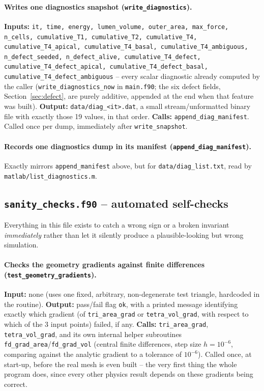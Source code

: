 \documentclass[11pt,a4paper]{report}
\begin{document}
\paragraph{Writes one diagnostics snapshot
(\texttt{write\_diagnostics}).} \textbf{Inputs:} \texttt{it, time,
energy, lumen\_volume, outer\_area, max\_force, n\_cells,
cumulative\_T1, cumulative\_T2, cumulative\_T4,
cumulative\_T4\_apical, cumulative\_T4\_basal,
cumulative\_T4\_ambiguous, n\_defect\_seeded, n\_defect\_alive,
cumulative\_T4\_defect, cumulative\_T4\_defect\_apical,
cumulative\_T4\_defect\_basal, cumulative\_T4\_defect\_ambiguous} --
every scalar diagnostic already computed by the caller
(\texttt{write\_diagnostics\_now} in \texttt{main.f90}; the six defect
fields, Section~\ref{sec:defect}, are purely additive, appended at the
end when that feature was built). \textbf{Output:}
\texttt{data/diag\_<it>.dat}, a small stream/unformatted binary file
with exactly those 19 values, in that order. \textbf{Calls:}
\texttt{append\_diag\_manifest}. Called once per dump, immediately
after \texttt{write\_snapshot}.
\paragraph{Records one diagnostics dump in its manifest
(\texttt{append\_diag\_manifest}).} Exactly mirrors
\texttt{append\_manifest} above, but for
\texttt{data/diag\_list.txt}, read by \texttt{matlab/list\_diagnostics.m}.

\subsection{\texttt{sanity\_checks.f90} -- automated self-checks}
\label{sec:mod-sanity}
Everything in this file exists to catch a wrong sign or a broken
invariant \emph{immediately} rather than let it silently produce a
plausible-looking but wrong simulation.
\paragraph{Checks the geometry gradients against finite differences
(\texttt{test\_geometry\_gradients}).} \textbf{Input:} none (uses one
fixed, arbitrary, non-degenerate test triangle, hardcoded in the
routine). \textbf{Output:} pass/fail flag \texttt{ok}, with a printed
message identifying exactly which gradient (of \texttt{tri\_area\_grad}
or \texttt{tetra\_vol\_grad}, with respect to which of the 3 input
points) failed, if any. \textbf{Calls:} \texttt{tri\_area\_grad},
\texttt{tetra\_vol\_grad}, and its own internal helper subroutines
\texttt{fd\_grad\_area}/\texttt{fd\_grad\_vol} (central finite
differences, step size $h=10^{-6}$, comparing against the analytic
gradient to a tolerance of $10^{-6}$). Called once, at start-up,
before the real mesh is even built -- the very first thing the whole
program does, since every other physics result depends on these
gradients being correct.
\end{document}
